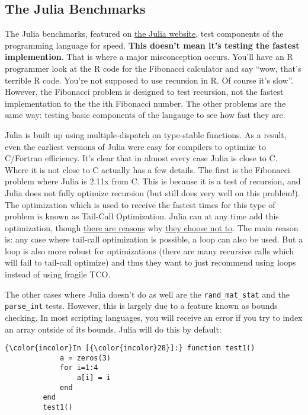 \documentclass[11pt]{article}
\begin{document}
    \subsection{The Julia Benchmarks}\label{the-julia-benchmarks}

The Julia benchmarks, featured on \href{http://julialang.org/}{the Julia
website}, test components of the programming language for speed.
\textbf{This doesn't mean it's testing the fastest implemention}. That
is where a major misconception occurs. You'll have an R programmer look
at the R code for the Fibonacci calculator and say ``wow, that's
terrible R code. You're not supposed to use recursion in R. Of course
it's slow''. However, the Fibonacci problem is designed to test
recursion, not the fastest implementation to the the ith Fibonacci
number. The other problems are the same way: testing basic components of
the langauge to see how fast they are.

Julia is built up using multiple-dispatch on type-stable functions. As a
result, even the earliest versions of Julia were easy for compilers to
optimize to C/Fortran efficiency. It's clear that in almost every case
Julia is close to C. Where it is not close to C actually has a few
details. The first is the Fibonacci problem where Julia is 2.11x from C.
This is because it is a test of recursion, and Julia does not fully
optimize recursion (but still does very well on this problem!). The
optimization which is used to receive the fastest times for this type of
problem is known as Tail-Call Optimization. Julia can at any time add
this optimization, though
\href{https://github.com/JuliaLang/julia/issues/4964}{there are reasons}
why
\href{https://groups.google.com/forum/?fromgroups=\#!searchin/julia-users/tail\$20call/julia-users/qHRDj80rIvA/T3AylpjsASEJ}{they
choose not to}. The main reason is: any case where tail-call
optimization is possible, a loop can also be used. But a loop is also
more robust for optimizations (there are many recursive calls which will
fail to tail-call optimize) and thus they want to just recommend using
loops instead of using fragile TCO.

The other cases where Julia doesn't do as well are the
\texttt{rand\_mat\_stat} and the \texttt{parse\_int} tests. However,
this is largely due to a feature known as bounds checking. In most
scripting languages, you will receive an error if you try to index an
array outside of its bounds. Julia will do this by default:

    \begin{Verbatim}[commandchars=\\\{\}]
{\color{incolor}In [{\color{incolor}28}]:} function test1()
             a = zeros(3)
             for i=1:4
                 a[i] = i
             end
         end
         test1()
\end{Verbatim}
\end{document}
